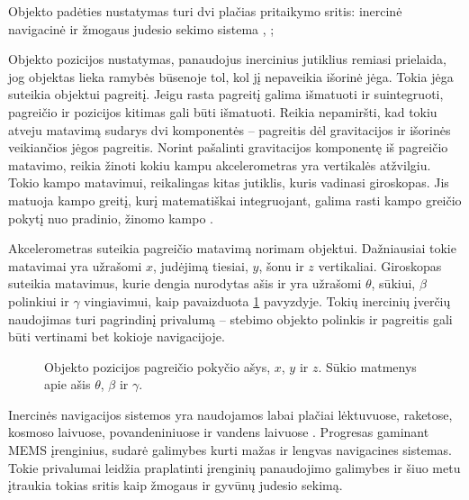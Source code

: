 Objekto padėties nustatymas turi dvi plačias pritaikymo sritis: inercinė navigacinė ir žmogaus judesio sekimo sistema \cite{schlomer2008gesture}, \cite{suvorova2012action};

Objekto pozicijos nustatymas, panaudojus inercinius jutiklius remiasi prielaida, jog objektas lieka ramybės būsenoje tol, kol jį nepaveikia išorinė jėga. Tokia jėga suteikia objektui pagreitį. Jeigu rasta pagreitį galima išmatuoti ir suintegruoti, pagreičio ir pozicijos kitimas gali būti išmatuoti. Reikia nepamiršti, kad tokiu atveju matavimą sudarys dvi komponentės -- pagreitis dėl gravitacijos ir išorinės veikiančios jėgos pagreitis. Norint pašalinti gravitacijos komponentę iš pagreičio matavimo, reikia žinoti kokiu kampu akcelerometras yra vertikalės atžvilgiu.
Tokio kampo matavimui, reikalingas kitas jutiklis, kuris vadinasi giroskopas. Jis matuoja kampo greitį, kurį matematiškai integruojant, galima rasti kampo greičio pokytį nuo pradinio, žinomo kampo \cite{sukkarieh2000low}.

Akcelerometras suteikia pagreičio matavimą norimam objektui. Dažniausiai tokie matavimai yra užrašomi $x$, judėjimą tiesiai, $y$, šonu ir $z$ vertikaliai. Giroskopas suteikia matavimus, kurie dengia nurodytas ašis ir yra užrašomi $\theta$, sūkiui, $\beta$ polinkiui ir $\gamma$ vingiavimui, kaip pavaizduota \ref{tikz:axis_of_the_system} pavyzdyje. Tokių inercinių įverčių naudojimas turi pagrindinį privalumą -- stebimo objekto polinkis ir pagreitis gali būti vertinami bet kokioje navigacijoje.  

\begin{figure}[H]
    \centering
    \caption{Objekto pozicijos pagreičio pokyčio ašys, $x$, $y$ ir $z$. Sūkio matmenys apie ašis $\theta$, $\beta$ ir $\gamma$.}
    \label{tikz:axis_of_the_system}
\end{figure}

Inercinės navigacijos sistemos yra naudojamos labai plačiai lėktuvuose, raketose, kosmoso laivuose, povandeniniuose ir vandens laivuose \cite{woodman2007introduction}. Progresas gaminant MEMS įrenginius, sudarė galimybes kurti mažas ir lengvas navigacines sistemas. Tokie privalumai leidžia praplatinti įrenginių panaudojimo galimybes ir šiuo metu įtraukia tokias sritis kaip žmogaus ir gyvūnų judesio sekimą.

